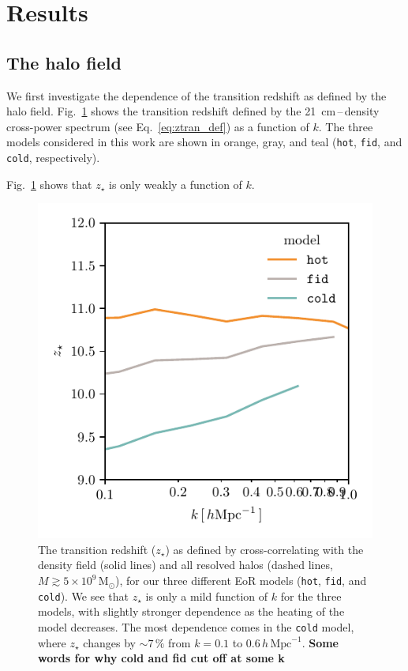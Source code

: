 \documentclass[a4paper,fleqn,usenatbib]{mnras}
\newcommand{\Msun}{\ensuremath{\text{M}_\odot}}
\newcommand{\hoverMpc}{\ensuremath{h\,\text{Mpc}^{-1}}}
\newcommand{\fid}{\texttt{fid}}
\newcommand{\hot}{\texttt{hot}}
\newcommand{\cold}{\texttt{cold}}
\newcommand{\zst}{\ensuremath{z_{\star}}}
\begin{document}
\section{Results} \label{sec:results}
\subsection{The halo field}
We first investigate the dependence of the transition redshift as defined by
the halo field. Fig.~\ref{fig:ztran_vs_k} shows the transition redshift
defined by the 21~cm\,--\,density cross-power spectrum (see
Eq.~\ref{eq:ztran_def}) as a function of $k$. The three models considered in
this work are shown in orange, gray, and teal (\hot{}, \fid{}, and \cold{},
respectively).

Fig.~\ref{fig:ztran_vs_k} shows that \zst{} is only weakly a function of $k$. 

\begin{figure}
\includegraphics[width=\columnwidth]{plots/ztran_vs_k.pdf}
\caption{The transition redshift ($\zst$) as defined by cross-correlating with the
density field (solid lines) and all resolved halos (dashed lines, $M\gtrsim
5\times10^9\,\Msun$), for our three different EoR models (\hot{}, \fid{}, and
\cold{}). We see that \zst{} is only a mild function of $k$ for the three
models, with slightly stronger dependence as the heating of the model
decreases. The most dependence comes in the \cold{} model, where \zst{}
changes by $\sim7\,\%$ from $k=0.1$ to $0.6\,\hoverMpc$. {\bf Some words for
why cold and fid cut off at some k}}
\label{fig:ztran_vs_k}
\end{figure}
\end{document}

